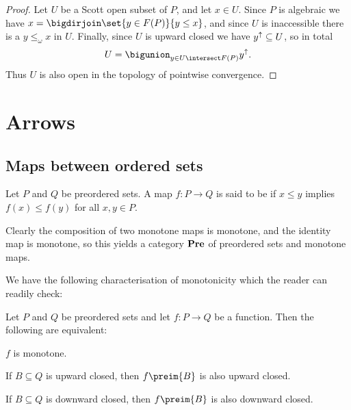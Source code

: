 \begin{proof}
    Let $U$ be a Scott open subset of $P$, and let $x \in U$. Since $P$ is algebraic we have $x = \bigdirjoin \set{y \in \finite{P}}{y \leq x}$, and since $U$ is inaccessible there is a $y \leq_\omega x$ in $U$. Finally, since $U$ is upward closed we have $\upset{y} \subseteq U$, so in total
    \begin{equation*}
        U
            = \bigunion_{y \in U \intersect \finite{P}} \upset{y}.
    \end{equation*}
    Thus $U$ is also open in the topology of pointwise convergence.
\end{proof}


\section{Arrows}

\subsection{Maps between ordered sets}\label{sec:ordered-sets-maps}

\begin{definition}
    Let $P$ and $Q$ be preordered sets. A map $f \colon P \to Q$ is said to be  if $x \leq y$ implies $f(x) \leq f(y)$ for all $x,y \in P$.
\end{definition}
%
Clearly the composition of two monotone maps is monotone, and the identity map is monotone, so this yields a category $\mathbf{Pre}$ of preordered sets and monotone maps.

We have the following characterisation of monotonicity which the reader can readily check:

\begin{propositionnoproof}
    \label{prop:monotone-upward-downward-closed}
    Let $P$ and $Q$ be preordered sets and let $f \colon P \to Q$ be a function. Then the following are equivalent:
    \begin{enumproposition}
        \item $f$ is monotone.
        \item If $B \subseteq Q$ is upward closed, then $f\preim{B}$ is also upward closed.
        \item If $B \subseteq Q$ is downward closed, then $f\preim{B}$ is also downward closed.
    \end{enumproposition}
\end{propositionnoproof}

